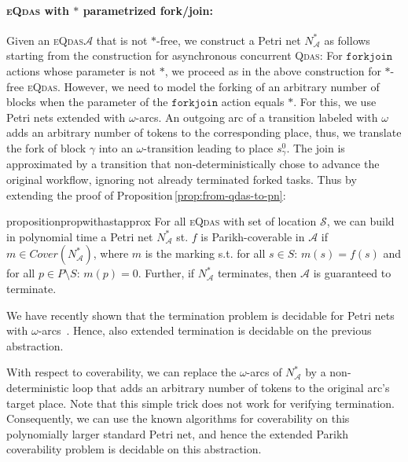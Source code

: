 \documentclass[runningheads,oribibl,]{article}
\newcommand{\Aa}{\ensuremath{\mathcal{A}}\xspace}
\newcommand{\Ss}{\ensuremath{\mathcal{S}}\xspace}
\newcommand{\cfont}[1]{\ensuremath{\mathtt{#1}}\xspace}
\newcommand{\qdas}{\textsc{Qdas}\xspace}
\newcommand{\eqdas}{\textsc{eQdas}\xspace}
\newcommand{\Cover}{\ensuremath{\textit{Cover}}}
\newcommand{\forkjoin}{\ensuremath{\cfont{forkjoin}}\xspace}
\begin{document}
\paragraph{\bf \eqdas with $\ast$ parametrized fork/join:}
Given an \eqdas $\Aa$ that is not $\ast$-free, we construct
a Petri net $N_\Aa^\ast$ as follows
starting from the construction for
asynchronous concurrent \qdas: For \forkjoin actions
whose parameter is not $\ast$, we proceed as in the above
construction for $\ast$-free \eqdas. However, we need to model
the forking of an arbitrary number of blocks when the parameter of
the \forkjoin action equals $\ast$. For this, we use Petri nets
extended with $\omega$-arcs. An outgoing arc of a transition labeled
with $\omega$ adds an arbitrary number of tokens to the corresponding
place, thus, we translate the fork of block $\gamma$ into an
$\omega$-transition leading to place $s_\gamma^0$. The join is
approximated by a transition that non-deterministically chose to
advance the original workflow, ignoring not already terminated forked
tasks. Thus by extending the proof of
Proposition\,\ref{prop:from-qdas-to-pn}:


\begin{restatable}{proposition}{propwithastapprox}
  \label{prop:withastapprox}
  For all \eqdas with set of location $\Ss$, we can build
  in polynomial time a Petri net $N_\Aa^\ast$ st. $f$ is
  Parikh-coverable in $\Aa$ if $m\in\Cover(N_\Aa^\ast)$, where $m$ is the
  marking s.t. for all $s\in S$: $m(s)=f(s)$ and for all $p\in
  P\setminus S$: $m(p)=0$. Further, if $N_\Aa^\ast$ terminates,
  then $\Aa$ is guaranteed to terminate.
\end{restatable}

We have recently shown that the termination problem is decidable for
Petri nets with $\omega$-arcs~\cite{geeraerts-g-2012--a}.
Hence, also  extended termination is decidable on the previous
abstraction.

With respect to coverability, we can replace the $\omega$-arcs of
$N_\Aa^\ast$ by a non-deterministic loop that adds an arbitrary
number of tokens to the original arc's target place. Note that this
simple trick does not work for verifying termination. Consequently,
we can use the known algorithms for coverability on this polynomially
larger standard Petri net, and hence  the extended Parikh
coverability problem is decidable on this abstraction.
\end{document}
